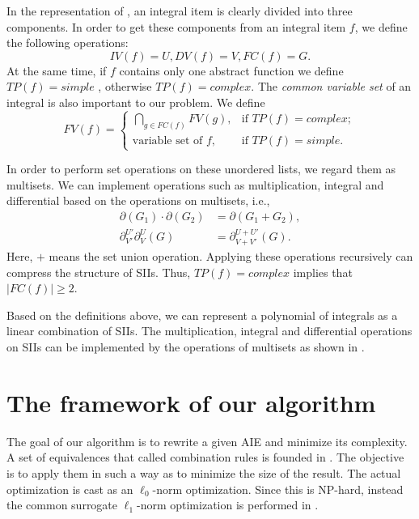 In the representation of  , an integral item is clearly divided into three components. In order to get these components from an integral item $f$, we define the following operations:
\begin{equation}
IV(f)=U,DV(f)=V,FC(f)=G.
\end{equation}
At the same time, if $f$ contains only one abstract function we define $TP(f)=simple$ , otherwise $TP(f)=complex$. The \emph{common variable set} of an integral is also important to our problem. We define 
\begin{equation}    
FV(f)=\left\{
\begin{array}{cl}
\bigcap\limits_{g\in FC(f)}{FV(g)}, &\text{if }TP(f)=complex;\\ 
\text{variable set of } f,          &\text{if }TP(f)=simple.
\end{array}
\right.
\end{equation}  

In order to perform set operations on these unordered lists, we regard them as multisets. We can implement operations such as multiplication, integral and differential based on the operations on multisets, i.e., 
\begin{equation}
\begin{split}
\partial(G_1)\cdot\partial(G_2)&=\partial(G_1+G_2),\\
\partial^{U'}_{V'}\partial^{U}_{V}(G)&=\partial^{U+U'}_{V+V'}(G).
\end{split}
\label{ops}
\end{equation}
Here, $+$ means the set union operation. Applying these operations recursively can compress the structure of SIIs. Thus, $TP(f)=complex$ implies that $|FC(f)|\ge 2$. 

Based on the definitions above, we can represent a polynomial of integrals as a linear combination of SIIs. The multiplication, integral and differential operations on SIIs can be implemented by the operations of multisets as shown in  . 

\section{The framework of our algorithm} \label{Simplify-03}
The goal of our algorithm is to rewrite a given AIE and minimize its complexity. A set of equivalences that called combination rules is founded in . The objective is to apply them in such a way as to minimize the size of the result. The actual optimization is cast as an $\ell_0$-norm optimization. Since this is NP-hard, instead the common surrogate $\ell_1$-norm optimization is performed in .


